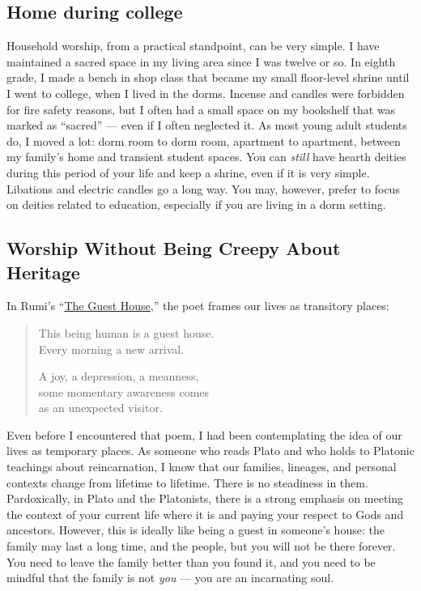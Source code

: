 \documentclass[
]{book}
\begin{document}
\hypertarget{home-during-college}{%
\subsection{Home during college}\label{home-during-college}}

Household worship, from a practical standpoint, can be very simple. I have maintained a sacred space in my living area since I was twelve or so. In eighth grade, I made a bench in shop class that became my small floor-level shrine until I went to college, when I lived in the dorms. Incense and candles were forbidden for fire safety reasons, but I often had a small space on my bookshelf that was marked as ``sacred'' --- even if I often neglected it. As most young adult students do, I moved a lot: dorm room to dorm room, apartment to apartment, between my family's home and transient student spaces. You can \emph{still} have hearth deities during this period of your life and keep a shrine, even if it is very simple. Libations and electric candles go a long way. You may, however, prefer to focus on deities related to education, especially if you are living in a dorm setting.

\hypertarget{worship-without-being-creepy-about-heritage}{%
\subsection{Worship Without Being Creepy About Heritage}\label{worship-without-being-creepy-about-heritage}}

In Rumi's ``\href{https://www.scottishpoetrylibrary.org.uk/poem/guest-house/}{The Guest House},'' the poet frames our lives as transitory places:

\begin{quote}
This being human is a guest house.\\
Every morning a new arrival.

A joy, a depression, a meanness,\\
some momentary awareness comes\\
as an unexpected visitor.
\end{quote}

Even before I encountered that poem, I had been contemplating the idea of our lives as temporary places. As someone who reads Plato and who holds to Platonic teachings about reincarnation, I know that our families, lineages, and personal contexts change from lifetime to lifetime. There is no steadiness in them. Pardoxically, in Plato and the Platonists, there is a strong emphasis on meeting the context of your current life where it is and paying your respect to Gods and ancestors. However, this is ideally like being a guest in someone's house: the family may last a long time, and the people, but you will not be there forever. You need to leave the family better than you found it, and you need to be mindful that the family is not \emph{you} --- you are an incarnating soul.
\end{document}
